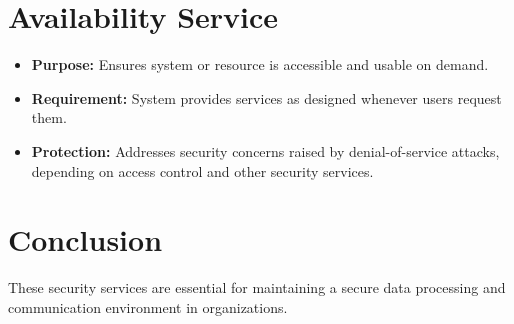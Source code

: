 \section{Availability Service}
\begin{itemize}
    \item \textbf{Purpose:} Ensures system or resource is accessible and usable on demand.
    \item \textbf{Requirement:} System provides services as designed whenever users request them.
    \item \textbf{Protection:} Addresses security concerns raised by denial-of-service attacks, depending on access control and other security services.
\end{itemize}

\section{Conclusion}
These security services are essential for maintaining a secure data processing and communication environment in organizations.
